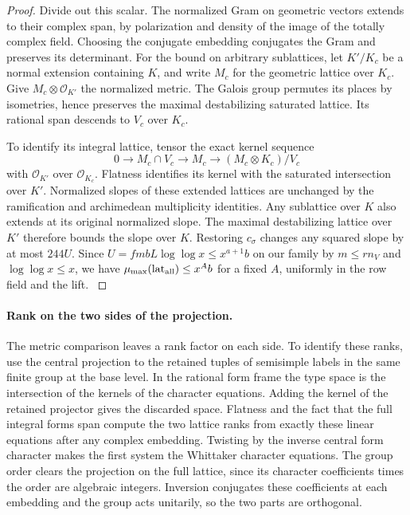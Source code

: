 \begin{proof}
Divide out this scalar. The normalized Gram on geometric
vectors extends to their complex span, by polarization and
density of the image of the totally complex field. Choosing
the conjugate embedding conjugates the Gram and preserves
its determinant. For the bound on arbitrary sublattices, let \(K'/K_c\) be a
normal extension containing \(K\), and write \(M_c\) for the
geometric lattice over \(K_c\). Give \(M_c\otimes\mathcal O_{K'}\)
the normalized metric. The Galois group permutes its places
by isometries, hence preserves the maximal destabilizing
saturated lattice. Its rational span descends to \(V_c\) over
\(K_c\).

To identify its integral lattice, tensor the exact
kernel sequence
\[
 0\longrightarrow M_c\cap V_c\longrightarrow M_c
       \longrightarrow (M_c\otimes K_c)/V_c
\]
with \(\mathcal O_{K'}\) over \(\mathcal O_{K_c}\).
Flatness identifies its kernel with the saturated
intersection over \(K'\). Normalized slopes of these extended
lattices are unchanged by the ramification and archimedean
multiplicity identities. Any sublattice over \(K\) also extends
at its original normalized slope. The maximal destabilizing
lattice over \(K'\) therefore bounds the slope over \(K\).
Restoring \(c_\sigma\) changes any squared slope by at most
\(244U\). Since \(U=fmbL\log\log x\le x^{a+1}b\) on our
family by \(m\le rn_V\) and \(\log\log x\le x\), we have
\(\mu_{\max}(\mathrm{lat}_{\rm all})\le x^A b\) for a fixed
\(A\), uniformly in the row field and the lift.
\label{cor:parent-cusp-slope-5}

\end{proof}

\paragraph{Rank on the two sides of the projection.}
The metric comparison leaves a rank factor on each side. To identify these ranks, use
the central projection to the retained tuples of
semisimple labels in the same finite group at the base level.
In the rational form frame the type space is the intersection
of the kernels of the character equations. Adding the kernel
of the retained projector gives the discarded space. Flatness
and the fact that the full integral forms span compute the two
lattice ranks from exactly these linear equations after any
complex embedding. Twisting by the inverse central form
character makes the first system the Whittaker character
equations. The group order clears the projection on the full
lattice, since its character coefficients times the order are
algebraic integers. Inversion conjugates these coefficients at
each embedding and the group acts unitarily, so the two parts
are orthogonal. \label{cor:parent-cusp-slope-6}

